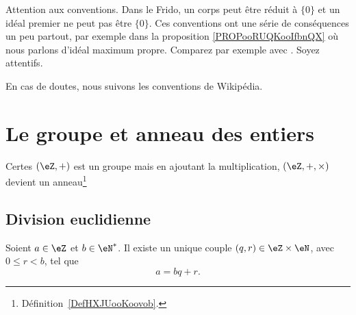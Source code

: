 
Attention aux conventions. Dans le Frido, un corps peut être réduit à \( \{ 0 \}\) et un idéal premier ne peut pas être \( \{ 0 \}\). Ces conventions ont une série de conséquences un peu partout, par exemple dans la proposition \ref{PROPooRUQKooIfbnQX} où nous parlons d'idéal maximum propre. Comparez par exemple avec \cite{ooWEUDooQybvIx}. Soyez attentifs.

En cas de doutes, nous suivons les conventions de Wikipédia.

\section{Le groupe et anneau des entiers}

Certes \( (\eZ,+)\) est un groupe mais en ajoutant la multiplication, \( (\eZ,+,\times)\) devient un anneau\footnote{Définition~\ref{DefHXJUooKoovob}.} 

\subsection{Division euclidienne}

\begin{theorem}     \label{ThoDivisEuclide}
    Soient \( a\in\eZ\) et \( b\in\eN^*\). Il existe un unique couple \( (q,r)\in\eZ\times\eN\), avec \( 0\leq r<b\), tel que
    \begin{equation}
        a=bq+r.
    \end{equation}
\end{theorem}

